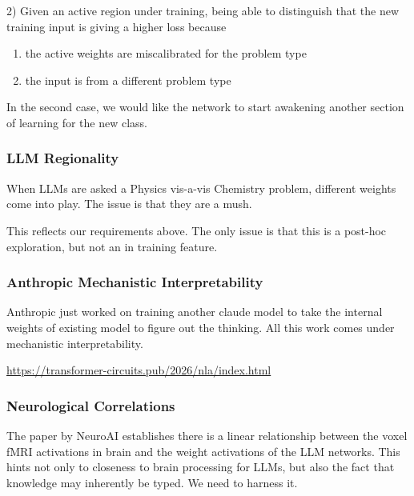 \documentclass{article}
\begin{document}
2) Given an active region under training, being able to distinguish that the new
training input is giving a higher loss because
\begin{enumerate}
	\item the active weights are miscalibrated for the problem type
	\item the input is from a different problem type
\end{enumerate}

In the second case, we would like the network to start awakening another section
of learning for the new class.

\subsubsection{LLM Regionality}

When LLMs are asked a Physics vis-a-vis Chemistry problem, different weights
come into play. The issue is that they are a mush.

This reflects our requirements above.
The only issue is that this is a post-hoc exploration, but not an in training
feature.

\subsubsection{Anthropic Mechanistic Interpretability}

Anthropic just worked on training another claude model to take the internal
weights of existing model to figure out the thinking.
All this work comes under mechanistic interpretability.

\url{https://transformer-circuits.pub/2026/nla/index.html}



\subsubsection{Neurological Correlations}

The paper by NeuroAI establishes there is a linear relationship between the
voxel fMRI activations in brain and the weight activations of the LLM networks.
This hints not only to closeness to brain processing for LLMs, but also the fact
that knowledge may inherently be typed. We need to harness it.
\end{document}
